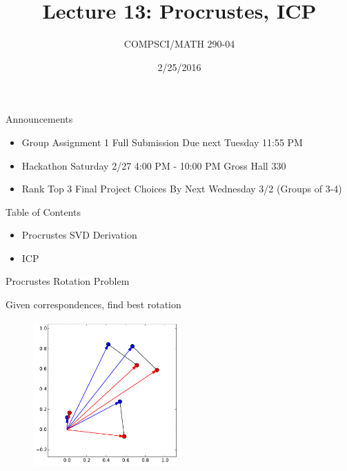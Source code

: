 \documentclass{beamer}
\title{Lecture 13: Procrustes, ICP}
\date{2/25/2016}
\institute{Chris Tralie, Duke University}
\author{COMPSCI/MATH 290-04}
\begin{document}
\frame{\titlepage}

\begin{frame}{Announcements}
\begin{itemize}[label=$\vartriangleright$]

\item Group Assignment 1 Full Submission Due next Tuesday 11:55 PM

\item Hackathon Saturday 2/27 4:00 PM - 10:00 PM Gross Hall 330

\item Rank Top 3 Final Project Choices By Next Wednesday 3/2 (Groups of 3-4)

\end{itemize}

\end{frame}

\begin{frame}{Table of Contents}
\begin{itemize}[label=$\blacktriangleright$]
	\item Procrustes SVD Derivation
\end{itemize}
\begin{itemize}[label=$\vartriangleright$]
	\item ICP 
\end{itemize}
\end{frame}

\begin{frame}{Procrustes Rotation Problem}

Given correspondences, find best rotation

\begin{figure}[t]
	\centering
    \includegraphics[width=0.5\textwidth]{2DProcrustes1.pdf}
\end{figure}



\end{frame}
\end{document}
